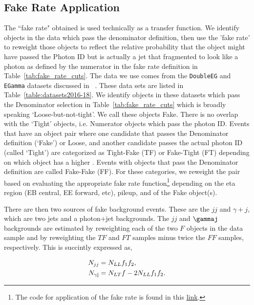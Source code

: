 \subsection{Fake Rate Application}
The ``fake rate" obtained is used technically as a transfer function. We identify objects in the data which pass the denominator definition, then use the 'fake rate' to reweight those objects to reflect the relative probability that the object might have passed the Photon ID but is actually a jet that fragmented to look like a photon as defined by the numerator in the fake rate definition in Table~\ref{tab:fake_rate_cuts}. The data we use comes from the \texttt{DoubleEG} and \texttt{EGamma} datasets discussed in ~\label{sec:datasets}. These data sets are listed in Table~\ref{table:datasets2016-18}. We identify objects in these datasets which pass the Denominator selection in Table~\ref{tab:fake_rate_cuts} which is broadly speaking `Loose-but-not-tight'. We call these objects Fake. There is no overlap with the `Tight' objects, i.e. Numerator objects which pass the photon ID. Events that have an object pair where one candidate that passes the Denominator definition (`Fake') or Loose, and another candidate passes the actual photon ID (called `Tight') are categorized as Tight-Fake (TF) or Fake-Tight (FT) depending on which object has a higher \pt. Events with objects that pass the Denominator definition are called Fake-Fake (FF). For these categories, we reweight the pair based on evaluating the appropriate fake rate function\footnote{The code for application of the fake rate is found in this \href{https://github.com/cms-exotica-diphotons/diphoton-analysis/blob/51de0227dce50e5ff11c2e0f718ca692094ee9bc/Tools/interface/fakePrediction.C#L249-L255}{link}.} depending on the eta region (EB central, EE forward, etc), pileup, and \pt of the Fake object(s). 

There are then two sources of fake background events. These are the $jj$ and $\gamma + j$, which are two jets and a photon+jet backgrounds. The $jj$ and $\gammaj$  backgrounds are estimated by reweighting each of the two $F$ objects in the data sample and by reweighting the $TF$ and $FT$ samples minus twice the $FF$ samples, respectively. This is succintly expressed as,

\begin{equation} \label{eq:nfake}
\begin{align}
   N_{jj} &= N_{LL}f_1f_2, \\
   N_{\gamma\textnormal{j}} &= N_{LT}f -  2N_{LL}f_1f_2. 
\end{align}
\end{equation}

